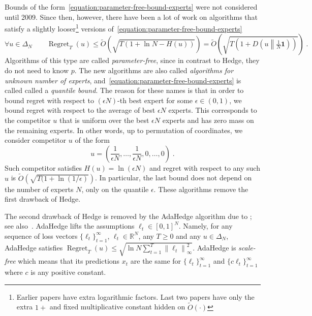 \documentclass{colt2016} %
\DeclareMathOperator{\Regret}{Regret}
\newcommand{\R}{\mathbb{R}}     %
\newcommand{\KL}[2]{D\left({#1}\middle\|{#2}\right)}  %
\newcommand{\norm}[1]{\left\|{#1}\right\|}
\newcommand{\indicator}{\mathbf{1}}
\begin{document}
Bounds of the form~\eqref{equation:parameter-free-bound-experts} were not
considered until 2009. Since then, however, there have been a lot of work
\citep{Chaudhuri-Freund-Hsu-2009, Chernov-Vovk-2010, Koolen-van-Erven-2015,
Luo-Schapire-2015, Foster-Rakhlin-Sridharan-2015,
Orabona-Pal-2016-parameter-free} on algorithms that satisfy a slightly
looser\footnote{Earlier papers have extra logarithmic factors. Last two papers
have only the extra $1+$ and fixed multiplicative constant hidden on
$\widetilde O(\cdot)$} versions
of~\eqref{equation:parameter-free-bound-experts}
\begin{equation}
\label{equation:parameter-free-bound-experts-2}
\forall u \in \Delta_N \qquad \Regret_T(u) \le \widetilde O(\sqrt{T (1 + \ln N - H(u))}) = \widetilde O\left(\sqrt{T(1 + \KL{u}{\tfrac{1}{N}\indicator} )} \right) \; .
\end{equation}
Algorithms of this type are called \emph{parameter-free}, since in contrast to
Hedge, they do not need to know $p$.  The new algorithms are also called
\emph{algorithms for unknown number of experts},
and~\eqref{equation:parameter-free-bound-experts} is called called a
\emph{quantile bound}. The reason for these names is that in order to bound
regret with respect to $(\epsilon N)$-th best expert for some $\epsilon \in (0,1)$,
we bound regret with respect to the average of best $\epsilon N$ experts.
This corresponds to the competitor $u$ that is uniform over the best $\epsilon
N$ experts and has zero mass on the remaining experts.  In other words, up to
permutation of coordinates, we consider competitor $u$ of the form
$$
u = \left( \frac{1}{\epsilon N}, \dots, \frac{1}{\epsilon N}, 0, \dots, 0 \right) \; .
$$
Such competitor satisfies $H(u) = \ln (\epsilon N)$ and regret with respect to
any such $u$ is $\widetilde O(\sqrt{T (1 + \ln(1/\epsilon)})$. In particular,
the last bound does not depend on the number of experts $N$, only on the
quantile $\epsilon$.  These algorithms remove the first drawback of Hedge.

The second drawback of Hedge is removed by the AdaHedge algorithm due to
\cite{de-Rooij-van-Erven-Grunwald-Koolen-2014}; see
also~\citep{Orabona-Pal-2016-parameter-free}. AdaHedge lifts the assumptions
$\ell_t \in [0,1]^N$. Namely, for any sequence of loss vectors
$\{\ell_t\}_{t=1}^\infty$, $\ell_t \in \R^N$, any $T \ge 0$ and any $u \in
\Delta_N$, AdaHedge satisfies $\Regret_T(u) \le \sqrt{\ln N \sum_{t=1}^T
\norm{\ell_t}_\infty^2}$. AdaHedge is \emph{scale-free} which means that its
predictions $x_t$ are the same for $\{\ell_t\}_{t=1}^\infty$ and $\{c
\ell_t\}_{t=1}^\infty$ where $c$ is any positive constant.
\end{document}
